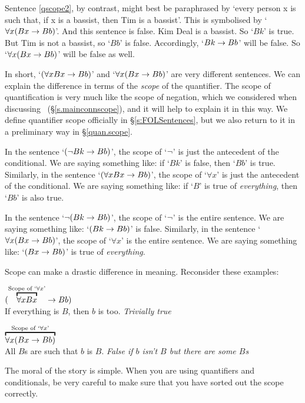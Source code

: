 Sentence \ref{qscope2}, by contrast, might best be paraphrased by `every person x is such that, if x is a bassist, then Tim is a bassist'. This is symbolised by `$\forall x (Bx \rightarrow Bb)$'. And this sentence is false. Kim Deal is a bassist. So `$Bk$' is true. But Tim is not a bassist, so `$Bb$' is false. Accordingly, `$Bk \rightarrow Bb$' will be false. So `$\forall x (Bx \rightarrow Bb)$' will be false as well. 

In short, `$(\forall x Bx \rightarrow Bb)$' and `$\forall x (Bx \rightarrow Bb)$' are very different sentences. We can explain the difference in terms of the \emph{scope} of the quantifier.  The scope of quantification is very much like the scope of negation, which we considered when discussing \TFL\ (§\ref{s.mainconnscope}), and it will help to explain it in this way. We define quantifier scope officially in §\ref{s:FOLSentences}, but we also return to it in a preliminary way in §\ref{quan.scope}.

In the sentence `$(\neg Bk \rightarrow Bb)$', the scope of `$\neg$' is just the antecedent of the conditional. We are saying something like: if `$Bk$' is false, then `$Bb$' is true. Similarly, in the sentence `$(\forall x Bx \rightarrow Bb)$', the scope of `$\forall x$' is just the antecedent of the conditional. We are saying something like: if `$B$' is true of \emph{everything}, then `$Bb$' is also true. 

In the sentence `$\neg(Bk \rightarrow Bb)$', the scope of `$\neg$' is the entire sentence. We are saying something like: `$(Bk \rightarrow Bb)$' is false. Similarly, in the sentence `$\forall x (Bx \rightarrow Bb)$', the scope of `$\forall x$' is the entire sentence. We are saying something like: `$(Bx \rightarrow Bb)$' is true of \emph{everything}.

Scope can make a drastic difference in meaning. Reconsider these examples:
\begin{earg}
    			\item[\ex{ben1}] $(\overbracket{\forall x Bx}^{\text{Scope of `$\forall x$'}}\eif Bb)$\\ If everything is $B$, then $b$ is too. \emph{Trivially true}
    			\item[\ex{ben2}] $\overbracket{\forall x (Bx \eif Bb)}^{\text{Scope of `$\forall x$'}}$\\ All $B$s are such that $b$ is $B$. \emph{False if $b$ isn't $B$ but there are some $B$s}
    		\end{earg}

The moral of the story is simple. When you are using quantifiers and conditionals, be very careful to make sure that you have sorted out the scope correctly. 

